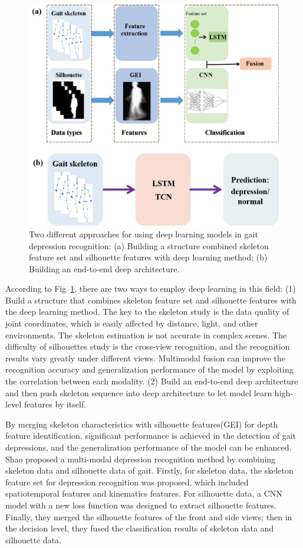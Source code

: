 \begin{figure}[tbp]
\centering
\includegraphics[width=0.98\linewidth]{gait_deeplearning.jpg}
\caption{Two different approaches for using deep learning models in gait depression recognition: (a) Building a structure combined skeleton feature set and silhouette features with deep learning method; (b) Building an end-to-end deep architecture.
}
\label{gait_deeplearning}
\end{figure}

According to Fig~\ref{gait_deeplearning}, there are two ways to employ deep learning in this field: (1) Build a structure that combines skeleton feature set and silhouette features with the deep learning method.
The key to the skeleton study is the data quality of joint coordinates, which is easily affected by distance, light, and other environments. The skeleton estimation is not accurate in complex scenes.
The difficulty of  silhouettes study is the cross-view recognition, and the recognition results vary greatly under different views. Multimodal fusion can improve the recognition accuracy and generalization performance of the model by exploiting the correlation between each modality. (2) Build an end-to-end deep architecture and then push skeleton sequence into deep architecture to let model learn high-level features by itself.


By merging skeleton characteristics with silhouette features(GEI) for depth feature identification, significant performance is achieved in the detection of gait depressions, and the generalization performance of the model can be enhanced.
Shao \cite{shao2021multi}  proposed a multi-modal depression recognition method by combining skeleton data and silhouette data of gait.
Firstly, for skeleton data, the skeleton feature set for depression recognition was proposed, which
included spatiotemporal features and kinematics features. For silhouette data, a CNN model with a new loss function was designed to extract silhouette features. Finally, they merged the silhouette features of the front and side views; then in the decision level, they fused the classification results of skeleton data and silhouette data.


